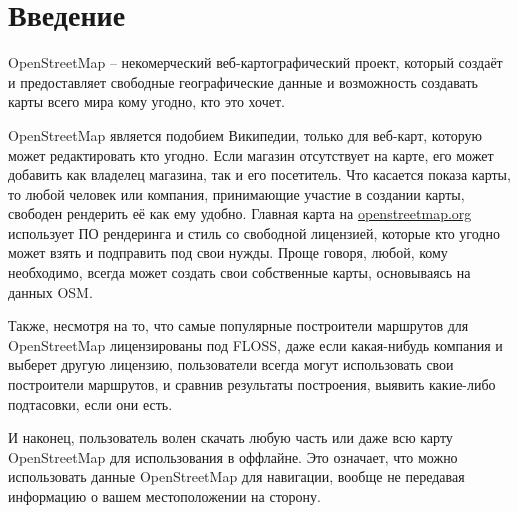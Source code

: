 \documentclass[a4paper, 14pt]{extreport}
\begin{document}
    \chapter{Введение}
    OpenStreetMap -- некомерческий веб-картографический проект, который создаёт и предоставляет свободные 
    географические данные и возможность создавать карты всего мира кому угодно, кто это хочет.

    OpenStreetMap является подобием Википедии, только для веб-карт, которую может редактировать кто 
    угодно. Если магазин отсутствует на карте, его может добавить как владелец магазина, так и его 
    посетитель. Что касается показа карты, то любой человек или компания, принимающие участие в создании 
    карты, свободен рендерить её как ему удобно. Главная карта на \url{openstreetmap.org} использует 
    ПО рендеринга и стиль со свободной лицензией, которые кто угодно может взять и подправить под свои 
    нужды. Проще говоря, любой, кому необходимо, всегда может создать свои собственные карты, основываясь 
    на данных OSM.

    Также, несмотря на то, что самые популярные построители маршрутов для OpenStreetMap лицензированы под 
    FLOSS, даже если какая-нибудь компания и выберет другую лицензию, пользователи всегда могут использовать 
    свои построители маршрутов, и сравнив результаты построения, выявить какие-либо подтасовки, если они 
    есть.

    И наконец, пользователь волен скачать любую часть или даже всю карту OpenStreetMap для использования в 
    оффлайне. Это означает, что можно использовать данные OpenStreetMap для навигации, вообще не передавая 
    информацию о вашем местоположении на сторону.
\end{document}
